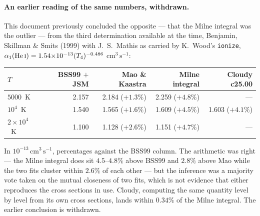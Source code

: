 \documentclass[english,a4paper]{my_memo}
\newcommand{\code}[1]{\texttt{#1}}
\newcommand{\cmc}{\mathrm{cm^{3}\,s^{-1}}}
\begin{document}
\paragraph{An earlier reading of the same numbers, withdrawn.}  This
document previously concluded the opposite --- that the Milne integral was
the outlier --- from the third determination available at the time,
Benjamin, Skillman \& Smits (1999) with J.~S.\ Mathis as carried by
K.~Wood's \code{ionize},
$\alpha_1({\rm He\,\textsc{i}}) = 1.54{\times}10^{-13}(T_4)^{-0.486}$
$\cmc$:
\begin{center}\small
\begin{tabular}{lrrrr}
\toprule
$T$ & BSS99 $+$ JSM & Mao \& Kaastra & Milne integral & Cloudy c25.00 \\
\midrule
$5000$~K       & 2.157 & 2.184 ($+1.3\%$) & 2.259 ($+4.8\%$) & --- \\
$10^4$~K       & 1.540 & 1.565 ($+1.6\%$) & 1.609 ($+4.5\%$) & 1.603 ($+4.1\%$) \\
$2{\times}10^4$~K & 1.100 & 1.128 ($+2.6\%$) & 1.151 ($+4.7\%$) & --- \\
\bottomrule
\end{tabular}
\end{center}
In $10^{-13}\,\cmc$, percentages against the BSS99 column.  The arithmetic
was right --- the Milne integral does sit $4.5$--$4.8\%$ above BSS99 and
$2.8\%$ above Mao while the two fits cluster within $2.6\%$ of each other
--- but the inference was a majority vote taken on the mutual closeness of
two fits, which is not evidence that either reproduces the cross sections in
use.  Cloudy, computing the same quantity level by level from its own cross
sections, lands within $0.34\%$ of the Milne integral.  The earlier
conclusion is withdrawn.
\end{document}
